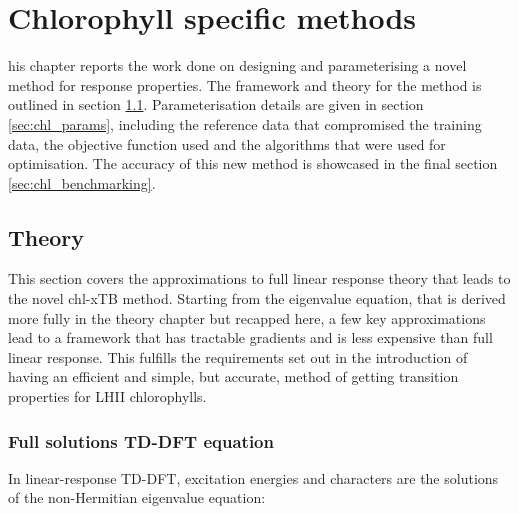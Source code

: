 %
%
\let\textcircled=\pgftextcircled
\chapter{Chlorophyll specific methods}
\label{chap:chl_xtb}

his chapter reports the work done on designing and parameterising a
novel method for response properties. The framework and theory for the method is
outlined in section \ref{sec:theory}. Parameterisation details are given in 
section \ref{sec:chl_params}, including the reference data that compromised the 
training data, the objective function used and the algorithms that were used for
optimisation. The accuracy of this new method is showcased in the final section 
\ref{sec:chl_benchmarking}.

\section{Theory}
\label{sec:theory}

This section covers the approximations to full linear response theory that leads to the 
novel chl-xTB method. Starting from the eigenvalue equation, that is derived more
fully in the theory chapter but recapped here, a few key approximations lead to 
a framework that has tractable gradients and is less expensive than full linear
response. This fulfills the requirements set out in the introduction of having
an efficient and simple, but accurate, method of getting transition properties
for LHII chlorophylls.

\subsection{Full solutions TD-DFT equation}
In linear-response TD-DFT, excitation energies and characters are the solutions
of the non-Hermitian eigenvalue equation:

